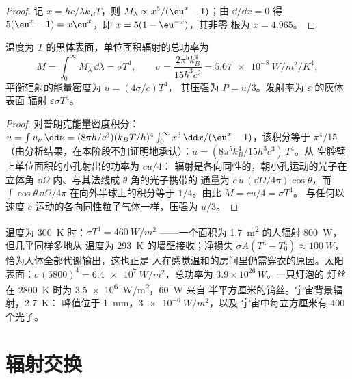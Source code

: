\begin{proof}
记 $x = hc/\lambda k_BT$，则 $M_\lambda \propto x^5/(\eu^x - 1)$；由 $\dd/\dd x = 0$
得 $5(\eu^x - 1) = x\eu^x$，即 $x = 5(1 - \eu^{-x})$，其非零
根为 $x = 4.965$。
\end{proof}

\begin{theorem}\label{thm:b2:thermal-radiation:stefan}
温度为 $T$ 的黑体表面，单位面积辐射的总功率为
\[
M = \int_0^\infty M_\lambda\,\dd\lambda = \sigma T^4, \qquad
\sigma = \frac{2\pi^5k_B^4}{15h^3c^2} = \qty{5.67e-8}{W/m^2/K^4} ;
\]
平衡辐射的能量密度为 $u = (4\sigma/c)T^4$，
其压强为 $P = u/3$。发射率为 $\varepsilon$ 的灰体表面
辐射 $\varepsilon\sigma T^4$。
\end{theorem}

\begin{proof}
对普朗克能量密度积分：$u = \int u_\nu\,\dd\nu = (8\pi h/c^3)(k_BT/h)^4
\int_0^\infty x^3\,\dd x/(\eu^x - 1)$，该积分等于 $\pi^4/15$
（由分析结果，在本阶段不加证明地承认）：$u = (8\pi^5k_B^4/15h^3c^3)\,T^4$。从
空腔壁上单位面积的小孔射出的功率为 $cu/4$：
辐射是各向同性的，朝小孔运动的光子在
立体角 $\dd\Omega$ 内、与其法线成 $\theta$ 角的光子携带的
通量为 $c\,u\,(\dd\Omega/4\pi)\cos\theta$，而 $\int\cos\theta\,\dd\Omega/4\pi$
在向外半球上的积分等于 $1/4$。由此 $M = cu/4 = \sigma T^4$。
与任何以速度 $c$ 运动的各向同性粒子气体一样，压强为
$u/3$。
\end{proof}

\begin{example}[数量级]\label{ex:b2:thermal-radiation:orders}
温度为 \qty{300}{K} 时：$\sigma T^4 = \qty{460}{W/m^2}$ ——一个面积为
\qty{1.7}{m^2} 的人辐射 \qty{800}{W}，但几乎同样多地从
温度为 \qty{293}{K} 的墙壁接收；净损失 $\sigma A(T^4 - T_0^4) \approx
\qty{100}{W}$，恰为人体全部代谢输出，这也正是
人在感觉温和的房间里仍需穿衣的原因。太阳表面：$\sigma
(5800)^4 = \qty{6.4e7}{W/m^2}$，总功率为 $3.9 \times 10^{26}\,\unit{W}$。一只灯泡的
灯丝在 \qty{2800}{K} 时为 \qty{3.5e6}{W/m^2}，\qty{60}{W} 来自
半平方厘米的钨丝。宇宙背景辐射，\qty{2.7}{K}：
峰值位于 \qty{1}{mm}，$\qty{3e-6}{W/m^2}$，以及
宇宙中每立方厘米有 $400$ 个光子。
\end{example}

\section{辐射交换}

